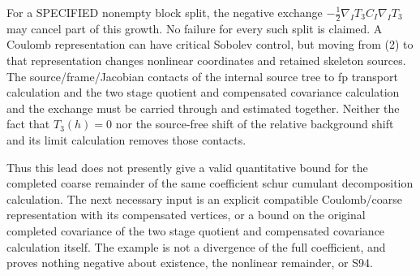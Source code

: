 \documentclass[11pt]{article}
\begin{document}
For a SPECIFIED nonempty block split, the negative exchange
$-\frac12\nabla_I T_3 C_I\nabla_I T_3$ may cancel part of this growth.
No failure for every such split is claimed. A Coulomb representation
can have critical Sobolev control, but moving from (2) to that
representation changes nonlinear coordinates and retained skeleton
sources. The source/frame/Jacobian contacts of the internal source tree to fp transport calculation and the two stage quotient and compensated covariance calculation and the exchange
must be carried through and estimated together. Neither the fact
that $T_3(h)=0$ nor the source-free shift of the relative background shift and its limit calculation removes those contacts.

Thus this lead does not presently give a valid quantitative bound
for the completed coarse remainder of the same coefficient schur cumulant decomposition calculation. The next necessary input is an
explicit compatible Coulomb/coarse representation with its compensated
vertices, or a bound on the original completed covariance of the two stage quotient and compensated covariance calculation itself.
The example is not a divergence of the full coefficient, and proves
nothing negative about existence, the nonlinear remainder, or S94.
\end{document}
